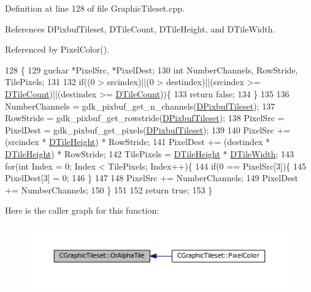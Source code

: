 Definition at line 128 of file Graphic\+Tileset.\+cpp.



References D\+Pixbuf\+Tileset, D\+Tile\+Count, D\+Tile\+Height, and D\+Tile\+Width.



Referenced by Pixel\+Color().


\begin{DoxyCode}
128                                                             \{
129     guchar *PixelSrc, *PixelDest;
130     \textcolor{keywordtype}{int} NumberChannels, RowStride, TilePixels;
131     
132     \textcolor{keywordflow}{if}((0 > srcindex)||(0 > destindex)||(srcindex >= \hyperlink{classCGraphicTileset_a39d942b370e47f441bf97385eb1037c8}{DTileCount})||(destindex >= 
      \hyperlink{classCGraphicTileset_a39d942b370e47f441bf97385eb1037c8}{DTileCount}))\{
133         \textcolor{keywordflow}{return} \textcolor{keyword}{false};
134     \}
135 
136     NumberChannels = gdk\_pixbuf\_get\_n\_channels(\hyperlink{classCGraphicTileset_a5d5adfcdbb347a6df3f57535ca08e3ef}{DPixbufTileset});
137     RowStride = gdk\_pixbuf\_get\_rowstride(\hyperlink{classCGraphicTileset_a5d5adfcdbb347a6df3f57535ca08e3ef}{DPixbufTileset});
138     PixelSrc = PixelDest = gdk\_pixbuf\_get\_pixels(\hyperlink{classCGraphicTileset_a5d5adfcdbb347a6df3f57535ca08e3ef}{DPixbufTileset});
139     
140     PixelSrc += (srcindex * \hyperlink{classCGraphicTileset_af48f32e07d5fe69afd5f764318cc3244}{DTileHeight}) * RowStride;
141     PixelDest += (destindex * \hyperlink{classCGraphicTileset_af48f32e07d5fe69afd5f764318cc3244}{DTileHeight}) * RowStride;
142     TilePixels = \hyperlink{classCGraphicTileset_af48f32e07d5fe69afd5f764318cc3244}{DTileHeight} * \hyperlink{classCGraphicTileset_a2d0c7d19865b81911a3a43d5cae50e00}{DTileWidth};
143     \textcolor{keywordflow}{for}(\textcolor{keywordtype}{int} Index = 0; Index < TilePixels; Index++)\{
144         \textcolor{keywordflow}{if}(0 == PixelSrc[3])\{
145             PixelDest[3] = 0;   
146         \}
147         
148         PixelSrc += NumberChannels;
149         PixelDest += NumberChannels;
150     \}
151     
152     \textcolor{keywordflow}{return} \textcolor{keyword}{true};
153 \}
\end{DoxyCode}
Here is the caller graph for this function\+:\nopagebreak
\begin{figure}[H]
\begin{center}
\leavevmode
\includegraphics[width=350pt]{classCGraphicTileset_ae456fe77a33c9954b6a22133f5843a15_icgraph}
\end{center}
\end{figure}
\hypertarget{classCGraphicTileset_af278c60b01100c430bedfcedd9e9489f}{}\label{classCGraphicTileset_af278c60b01100c430bedfcedd9e9489f} 
